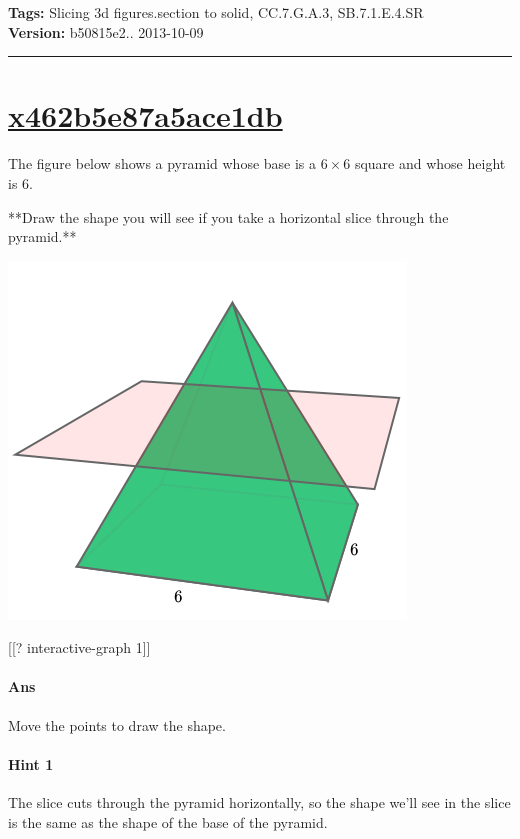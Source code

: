 \documentclass[twocolumn,10pt]{article}
\def\shrinkfactor{0.4}
\begin{document}
\medskip
\noindent
\textbf{Tags:} {\footnotesize Slicing 3d figures.section to solid, CC.7.G.A.3, SB.7.1.E.4.SR}\\
\textbf{Version:} b50815e2.. 2013-10-09
\smallskip\hrule





\section{\href{https://www.khanacademy.org/devadmin/content/items/x462b5e87a5ace1db}{x462b5e87a5ace1db}}

\noindent
The figure below shows a pyramid whose base is a $6\times 6$ square and whose height is $6$.   

**Draw the shape you will see if you take a horizontal slice through the pyramid.**


\includegraphics[scale=\shrinkfactor]{figures/4e6db0b061f7d0aaab47e90516b4d1a2b8bb2023.png}

[[? interactive-graph 1]] 

\paragraph{Ans} Move the points to draw the shape. 

\paragraph{Hint 1}The slice cuts through the pyramid horizontally, so the shape we'll see in the slice is the same as the shape of the base of the pyramid.
\end{document}
